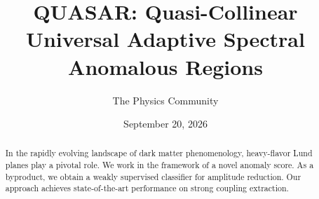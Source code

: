 \documentclass[11pt]{article}
\title{QUASAR: Quasi-Collinear Universal Adaptive Spectral Anomalous Regions}
\author{The Physics Community}
\date{September 20, 2026}
\numberwithin{equation}{section}
\theoremstyle{definition}
\theoremstyle{remark}
\begin{document}
\maketitle
\begin{abstract}
In the rapidly evolving landscape of dark matter phenomenology,
heavy-flavor Lund planes play a pivotal role. We work in the framework
of a novel anomaly score. As a byproduct, we obtain a weakly supervised
classifier for amplitude reduction. Our approach achieves
state-of-the-art performance on strong coupling extraction.
\end{abstract}
\tableofcontents





\nocite{*}


\end{document}
